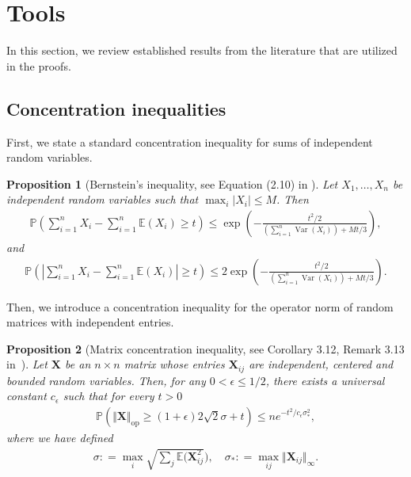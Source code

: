 \documentclass[11pt]{article}
\newcommand{\op}{\mathrm{op}}
\newcommand{\Var}{\operatorname{Var}}
\newcommand{\bbE}{\mathbb{E}}
\newcommand{\bbP}{\mathbb{P}}
\newcommand{\bX}{\bm{X}}
\newcommand{\<}{\langle}
\renewcommand{\>}{\rangle}
\theoremstyle{plain}
\newtheorem{prop}{Proposition}
\theoremstyle{definition}
\theoremstyle{remark}
\begin{document}
{\section{Tools}\label{appendix: tools}

In this section, we review established results from the literature that are utilized in the proofs.

\subsection{Concentration inequalities}

First, we state a standard concentration inequality for sums of independent random variables.

\begin{prop}[Bernstein's inequality, see Equation (2.10) in \citep{boucheron_concentration_inequalities}]
    Let $X_1, \ldots, X_n$ be independent random variables such that $\max_i |X_i| \le M$. Then
    \begin{align*}
    	\bbP \left (\sum_{i = 1}^n X_i - \sum_{i = 1}^n \bbE (X_i) \ge  t
    	\right )
    	\le \exp \left (
    		- \frac{t^2/2}{\left(\sum_{i = 1}^n \Var (X_i)\right) + M t/3}
    	\right ), 
    \end{align*}
    and
    \begin{align*}
    	\bbP \left (
    		\left|\sum_{i = 1}^n X_i - \sum_{i = 1}^n \bbE (X_i) \right|\ge  t
    	\right )
    	\le 2\exp \left (
    		- \frac{t^2/2}{\left(\sum_{i = 1}^n \Var (X_i)\right) + M t/3}
    	\right ).
    \end{align*}
\end{prop}

Then, we introduce a concentration inequality for the operator norm of random matrices with independent entries.

\begin{prop}[Matrix concentration inequality, see Corollary 3.12, Remark 3.13 in~\citep{bandeira2016}]
\label{proposition: matrix concentration}
	Let $\bX$ be an $n \times n$ matrix whose entries $\bX_{i j}$ are independent, centered and bounded random variables. Then, for any $0 < \epsilon \le 1/2$,  there exists a universal constant $c_\epsilon$ such that for every $t > 0$
	\begin{align*}
		\bbP \left ( \Vert \bX \Vert_{\op} \ge (1 + \epsilon) 2 \sqrt{2} \sigma + t \right ) \le n e^{-t^2 / c_\epsilon \sigma_*^2},
	\end{align*}
	where we have defined
	\begin{align*}
		\sigma : = \max_i \sqrt{\sum_j \bbE (\bX_{i j}^2}), \quad \sigma_* : = \max_{i j}  \Vert \bX_{i j} \Vert_{\infty}.
	\end{align*}
\end{prop}

}
\end{document}
